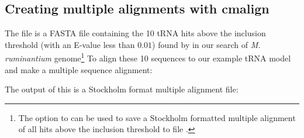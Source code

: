 \subsection{Creating multiple alignments with cmalign}
The file  is a FASTA file containing
the 10 tRNA hits above the inclusion threshold (with an E-value
less than $0.01$) found by  in our 
search of \emph{M. ruminantium} genome\footnote{The
   option to  can be used to save a
  Stockholm formatted multiple alignment of all hits above the
  inclusion threshold to file .}
To align these 10 sequences to our example tRNA model and make a multiple sequence
alignment:


The output of this is a Stockholm format multiple alignment file:

